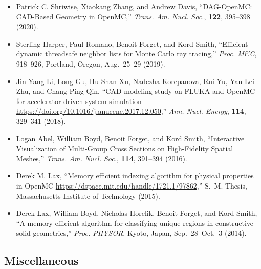 \begin{itemize}
\item Patrick C. Shriwise, Xiaokang Zhang, and Andrew Davis, ``DAG-OpenMC: CAD-Based
Geometry in OpenMC,'' \textit{Trans. Am. Nucl. Soc.}, \textbf{122}, 395--398 (2020).

\item Sterling Harper, Paul Romano, Benoit Forget, and Kord Smith, ``Efficient
dynamic threadsafe neighbor lists for Monte Carlo ray tracing,'' \textit{Proc. M\&C},
918--926, Portland, Oregon, Aug.\ 25--29 (2019).

\item Jin-Yang Li, Long Gu, Hu-Shan Xu, Nadezha Korepanova, Rui Yu, Yan-Lei Zhu, and
Chang-Ping Qin, ``CAD modeling study on FLUKA and OpenMC for accelerator
driven system simulation \url{https://doi.org/10.1016/j.anucene.2017.12.050},''
\textit{Ann. Nucl. Energy}, \textbf{114}, 329--341 (2018).

\item Logan Abel, William Boyd, Benoit Forget, and Kord Smith, ``Interactive
Visualization of Multi-Group Cross Sections on High-Fidelity Spatial Meshes,''
\textit{Trans. Am. Nucl. Soc.}, \textbf{114}, 391--394 (2016).

\item Derek M. Lax, ``Memory efficient indexing algorithm for physical properties in
OpenMC \url{https://dspace.mit.edu/handle/1721.1/97862},'' S.~M. Thesis,
Massachusetts Institute of Technology (2015).

\item Derek Lax, William Boyd, Nicholas Horelik, Benoit Forget, and Kord Smith, ``A
memory efficient algorithm for classifying unique regions in constructive
solid geometries,'' \textit{Proc. PHYSOR}, Kyoto, Japan, Sep.\ 28--Oct.\ 3 (2014).
\end{itemize}

\subsection{Miscellaneous}

